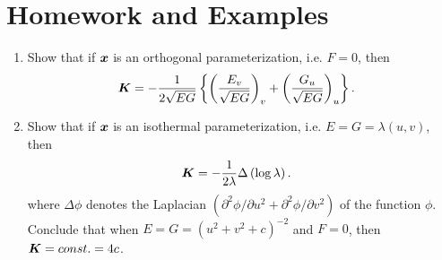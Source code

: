 \documentclass[11pt]{article}
\begin{document}
\section{Homework and Examples}
\begin{enumerate}
\item \begin{example}
Show that if $\boldsymbol{x}$ is an orthogonal parameterization, i.e. $F=0$, then 
\begin{align*}
\boldsymbol{K} &= -\frac{1}{2\sqrt{EG}}\left\{\left(\frac{E_{v}}{\sqrt{EG}}\right)_{v} + \left(\frac{G_{u}}{\sqrt{EG}}\right)_{u} \right\}.
\end{align*}
\end{example}


\item \begin{example}
Show that if $\boldsymbol{x}$ is an isothermal parameterization, i.e. $E=G=\lambda(u,v)$, then 
\begin{align*}
\boldsymbol{K} &= -\frac{1}{2\lambda}\Delta\left(\log \lambda\right).
\end{align*}
where $\Delta\phi$ denotes the Laplacian $(\partial^{2} \phi/ \partial u^{2}+ \partial^{2} \phi/ \partial v^{2})$ of the function $\phi$. Conclude that when $E=G=(u^{2}+ v^{2}+ c)^{-2}$ and $F=0$, then $\boldsymbol{K} = const. = 4c$.
\end{example}


\end{enumerate}

\newpage


\end{document}

